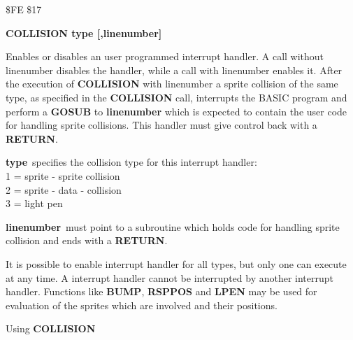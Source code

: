 \begin{description}[leftmargin=3cm,style=nextline]
\item [Token:] \$FE \$17
\item [Format:] {\bf COLLISION type [,linenumber]}
\item [Usage:]  Enables or disables
                an user programmed interrupt handler.
                A call without linenumber disables the handler,
                while a call with linenumber enables it.
                After the execution of {\bf COLLISION} with
                linenumber a sprite collision of the same type,
                as specified in the {\bf COLLISION} call,
                interrupts the BASIC program and perform a {\bf GOSUB}
                to {\bf linenumber} which is expected to contain
                the user code for handling sprite collisions.
                This handler must give control back with a {\bf RETURN}.

                {\bf type} specifies the collision type for
                this interrupt handler: \\
                1 = sprite - sprite collision \\
                2 = sprite - data - collision \\
                3 = light pen

                {\bf linenumber} must point to a subroutine
                which holds code for handling sprite collision
                and ends with a {\bf RETURN}.

\item [Remarks:] It is possible to enable interrupt handler for
               all types, but only one can execute at any time.
               A interrupt handler cannot be interrupted by another
               interrupt handler.
               Functions like {\bf BUMP}, {\bf RSPPOS} and
               {\bf LPEN} may be used for evaluation of the sprites
               which are involved and their positions.

\item [Example:] Using {\bf COLLISION}
\end{description}

